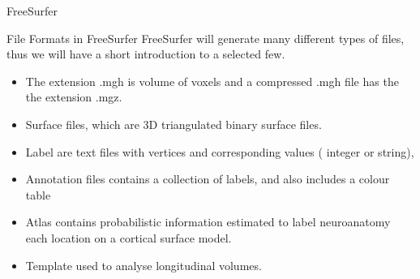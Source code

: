 \documentclass{beamer}
\begin{document}
\begin{frame}{FreeSurfer}
\begin{block}{File Formats in FreeSurfer}
FreeSurfer will generate many different types of files, thus we will have a short introduction to a selected few.
\begin{itemize}
\item<2-> The extension .mgh is volume of voxels and a compressed .mgh file has the the extension .mgz.
\item<3-> Surface files, which are 3D triangulated binary surface files. 
\item<4-> Label are text files with vertices and corresponding values ( integer or string), \href{run:./Files/lh.BA1.label}{}
\item<5-> Annotation files contains a collection of labels, and also includes a colour table     
\item<6-> Atlas contains probabilistic information estimated to label neuroanatomy each location on a cortical surface model. 
\item<7-> Template used to analyse longitudinal volumes.

\end{itemize}
\end{block}
\end{frame}
\end{document}
